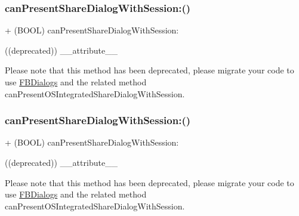 \subsubsection{\texorpdfstring{can\+Present\+Share\+Dialog\+With\+Session\+:()}{canPresentShareDialogWithSession:()}\hspace{0.1cm}{\footnotesize\ttfamily [3/5]}}
{\footnotesize\ttfamily + (B\+O\+OL) can\+Present\+Share\+Dialog\+With\+Session\+: \begin{DoxyParamCaption}\item[{((deprecated))}]{\+\_\+\+\_\+attribute\+\_\+\+\_\+ }\end{DoxyParamCaption}}

Please note that this method has been deprecated, please migrate your code to use {\ttfamily \hyperlink{interfaceFBDialogs}{F\+B\+Dialogs}} and the related method {\ttfamily can\+Present\+O\+S\+Integrated\+Share\+Dialog\+With\+Session}. \mbox{\label{interfaceFBNativeDialogs_a8b8d5049303db38cf3f214e0367ea424}} 
\subsubsection{\texorpdfstring{can\+Present\+Share\+Dialog\+With\+Session\+:()}{canPresentShareDialogWithSession:()}\hspace{0.1cm}{\footnotesize\ttfamily [4/5]}}
{\footnotesize\ttfamily + (B\+O\+OL) can\+Present\+Share\+Dialog\+With\+Session\+: \begin{DoxyParamCaption}\item[{((deprecated))}]{\+\_\+\+\_\+attribute\+\_\+\+\_\+ }\end{DoxyParamCaption}}

Please note that this method has been deprecated, please migrate your code to use {\ttfamily \hyperlink{interfaceFBDialogs}{F\+B\+Dialogs}} and the related method {\ttfamily can\+Present\+O\+S\+Integrated\+Share\+Dialog\+With\+Session}. \mbox{\label{interfaceFBNativeDialogs_a8b8d5049303db38cf3f214e0367ea424}} 
